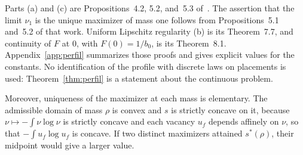 Parts (a) and (c) are Propositions~4.2, 5.2, and~5.3 of~\cite{Perfil}. The assertion that the limit $\nu_1$
is the unique maximizer of
mass one follows from Propositions~5.1 and~5.2 of that work. Uniform Lipschitz regularity (b) is its
Theorem~7.7, and continuity of $F$
at $0$, with $F(0)=1/b_0$, is its Theorem~8.1. Appendix~\ref{app:perfil} summarizes those proofs and gives
explicit values for the
constants. No identification of the profile with discrete laws on placements is used:
Theorem~\ref{thm:perfil} is a statement about the continuous problem.

Moreover, uniqueness of the maximizer at each mass is elementary. The admissible domain of mass $\rho$ is
convex and $s$ is
strictly concave on it, because $\nu\mapsto-\int\nu\log\nu$ is strictly concave and each vacancy $u_f$
depends affinely on $\nu$,
so that $-\int u_f\log u_f$ is concave. If two distinct maximizers attained $s^*(\rho)$, their midpoint
would give a larger
value.
